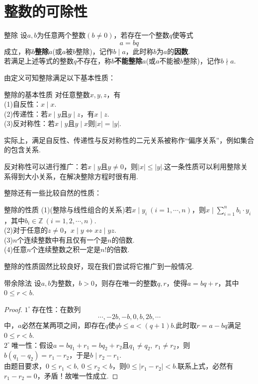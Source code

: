 \documentclass[lang=cn, zihao=5]{elegantbook}
\newcommand{\buzhou}[1]{$#1^{\circ} \ $}
\begin{document}
\section{整数的可除性}

\begin{definition}{整除}
	设$a,b$为任意两个整数$(b \neq 0)$，若存在一个整数$q$使等式$$a=bq$$成立，称$b$\textbf{整除}$a$(或$a$被$b$整除)，记作$b \mid a$，此时称$b$为$a$的\textbf{因数}. \\
	若满足上述等式的整数$q$不存在，称$b$\textbf{不能整除}$a$(或$a$不能被$b$整除)，记作$b \nmid a$.
\end{definition}

由定义可知整除满足以下基本性质：

\begin{theorem}{整除的基本性质}
	对任意整数$x,y,z$，有 \\
	(1)自反性：$x \mid x$. \\
	(2)传递性：若$x \mid y$且$y \mid z$，有$x \mid z$. \\
	(3)反对称性：若$x \mid y$且$y \mid x$则$|x|=|y|$.
\end{theorem}
\begin{remark}
	实际上，满足自反性、传递性与反对称性的二元关系被称作“偏序关系”，例如集合的包含关系.
\end{remark}
\begin{remark}
	反对称性可以进行推广：若$x \mid y$且$y \neq 0$，则$|x| \leq |y|$.这一条性质可以利用整除关系得到大小关系，在解决整除方程时很有用.
\end{remark}

整除还有一些比较自然的性质：

\begin{theorem}{整除的性质}
	(1)(整除与线性组合的关系)若$x \mid y_i~(i=1,\cdots ,n)$，则$x \mid \sum_{i=1}^{n} b_i \cdot y_i$，其中$b_i \in \mathbb{Z}~(i=1,2,\cdots ,n)$. \\
	(2)对于任意的$z \neq 0$，$x \mid y \Leftrightarrow xz \mid yz$. \\
	(3)$n$个连续整数中有且仅有一个是$n$的倍数. \\
	(4)任意$n$个连续整数之积一定是$n!$的倍数.
\end{theorem}

整除的性质固然比较良好，现在我们尝试将它推广到一般情况.

\begin{theorem}{带余除法}
	设$a,b$为整数，$b>0$，则存在唯一的整数$q,r$，使得$a=bq+r$，其中$0 \leq r <b$.
\end{theorem}
\begin{proof}
	\buzhou{1}存在性：在数列$$\cdots , -2b ,-b , 0 ,b,2b,\cdots $$中，$a$必然在某两项之间，即存在$q$使$qb \leq a < (q+1)b$.此时取$r=a-bq$满足$0 \leq r <b$. \\
	\buzhou{2}唯一性：假设$a=bq_1+r_1=bq_2+r_2$且$q_1 \neq q_2,~r_1 \neq r_2$，则$b(q_1-q_2)=r_1-r_2$，于是$b \mid r_2-r_1$. \\
	由题目要求，$0 \leq r_1 < b,~0 \leq r_2 < b$，则$0 \leq |r_1-r_2| < b$.联系上式，必然有$r_1-r_2=0$，矛盾！故唯一性成立.
\end{proof}
\end{document}
